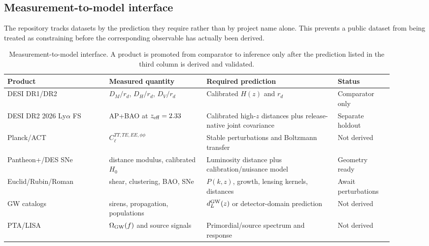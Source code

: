 \subsection{Measurement-to-model interface}
The repository tracks datasets by the prediction they require rather than by project name alone. This prevents a public dataset from being treated as constraining \SCPC{} before the corresponding observable has actually been derived.
\begin{table}[ht]
\centering
\small
\begin{tabular}{p{0.24\linewidth}p{0.23\linewidth}p{0.31\linewidth}p{0.13\linewidth}}
\toprule
Product & Measured quantity & Required \SCPC{} prediction & Status\\
\midrule
DESI DR1/DR2 & $D_M/r_d$, $D_H/r_d$, $D_V/r_d$ & Calibrated $H(z)$ and $r_d$ & Comparator only\\
DESI DR2 2026 Ly$\alpha$ FS & AP+BAO at $z_{\rm eff}=2.33$ & Calibrated high-$z$ distances plus release-native joint covariance & Separate holdout\\
Planck/ACT & $C_\ell^{TT,TE,EE,\phi\phi}$ & Stable perturbations and Boltzmann transfer & Not derived\\
Pantheon+/DES SNe & distance modulus, calibrated $H_0$ & Luminosity distance plus calibration/nuisance model & Geometry ready\\
Euclid/Rubin/Roman & shear, clustering, BAO, SNe & $P(k,z)$, growth, lensing kernels, distances & Await perturbations\\
GW catalogs & sirens, propagation, populations & $d_L^{\rm GW}(z)$ or detector-domain prediction & Not derived\\
PTA/LISA & $\Omega_{\rm GW}(f)$ and source signals & Primordial/source spectrum and response & Not derived\\
\bottomrule
\end{tabular}
\caption{Measurement-to-model interface. A product is promoted from comparator to \SCPC{} inference only after the prediction listed in the third column is derived and validated.}
\label{tab:measurement-interface}
\end{table}
